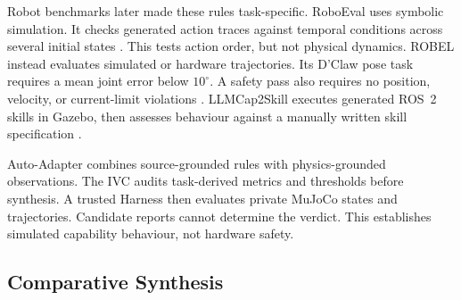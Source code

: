 Robot benchmarks later made these rules task-specific. RoboEval uses symbolic
simulation. It checks generated action traces against temporal conditions across
several initial states \citep{hu2024codebotler}. This tests action order, but not
physical dynamics. ROBEL instead evaluates simulated or hardware trajectories.
Its D'Claw pose task requires a mean joint error below \(10^\circ\). A safety
pass also requires no position, velocity, or current-limit violations
\citep{ahn2020robel}. LLMCap2Skill executes generated ROS~2 skills in Gazebo,
then assesses behaviour against a manually written skill specification
\citep{vieira2025cap2skill}.

Auto-Adapter combines source-grounded rules with physics-grounded observations.
The IVC audits task-derived metrics and thresholds before synthesis. A trusted
Harness then evaluates private MuJoCo states and trajectories. Candidate reports
cannot determine the verdict. This establishes simulated capability behaviour,
not hardware safety.

\subsection{Comparative Synthesis}
\label{sec:comparative-synthesis}
